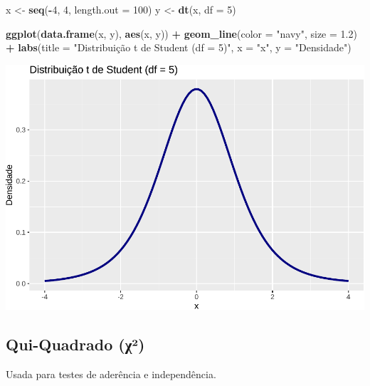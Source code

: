 \documentclass[
]{book}
\newenvironment{Shaded}{\begin{snugshade}}{\end{snugshade}}
\newcommand{\AttributeTok}[1]{\textcolor[rgb]{0.13,0.29,0.53}{#1}}
\newcommand{\DecValTok}[1]{\textcolor[rgb]{0.00,0.00,0.81}{#1}}
\newcommand{\FloatTok}[1]{\textcolor[rgb]{0.00,0.00,0.81}{#1}}
\newcommand{\FunctionTok}[1]{\textcolor[rgb]{0.13,0.29,0.53}{\textbf{#1}}}
\newcommand{\NormalTok}[1]{#1}
\newcommand{\OtherTok}[1]{\textcolor[rgb]{0.56,0.35,0.01}{#1}}
\newcommand{\SpecialCharTok}[1]{\textcolor[rgb]{0.81,0.36,0.00}{\textbf{#1}}}
\newcommand{\StringTok}[1]{\textcolor[rgb]{0.31,0.60,0.02}{#1}}
\begin{document}
\begin{Shaded}
\begin{Highlighting}[]
\NormalTok{x }\OtherTok{\textless{}{-}} \FunctionTok{seq}\NormalTok{(}\SpecialCharTok{{-}}\DecValTok{4}\NormalTok{, }\DecValTok{4}\NormalTok{, }\AttributeTok{length.out =} \DecValTok{100}\NormalTok{)}
\NormalTok{y }\OtherTok{\textless{}{-}} \FunctionTok{dt}\NormalTok{(x, }\AttributeTok{df =} \DecValTok{5}\NormalTok{)}

\FunctionTok{ggplot}\NormalTok{(}\FunctionTok{data.frame}\NormalTok{(x, y), }\FunctionTok{aes}\NormalTok{(x, y)) }\SpecialCharTok{+}
  \FunctionTok{geom\_line}\NormalTok{(}\AttributeTok{color =} \StringTok{"navy"}\NormalTok{, }\AttributeTok{size =} \FloatTok{1.2}\NormalTok{) }\SpecialCharTok{+}
  \FunctionTok{labs}\NormalTok{(}\AttributeTok{title =} \StringTok{"Distribuição t de Student (df = 5)"}\NormalTok{, }\AttributeTok{x =} \StringTok{"x"}\NormalTok{, }\AttributeTok{y =} \StringTok{"Densidade"}\NormalTok{)}
\end{Highlighting}
\end{Shaded}

\includegraphics{Livro-Estatistica+R_files/figure-latex/student-1.pdf}

\subsection{Qui-Quadrado (χ²)}\label{qui-quadrado-ux3c7uxb2}

Usada para testes de aderência e independência.
\end{document}
